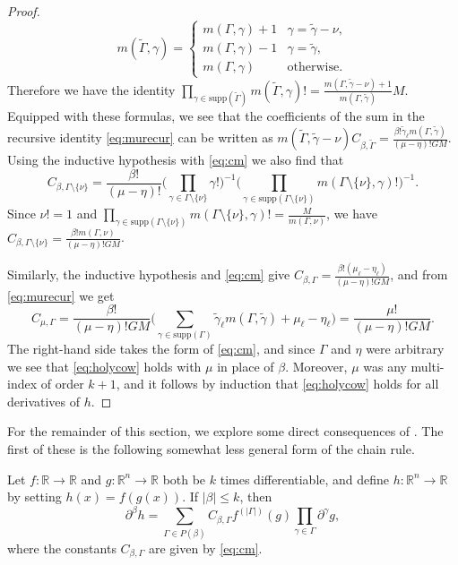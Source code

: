 \documentclass[oneside,hidelinks,indentfirst,10pt]{book}
\begin{document}
\begin{proof}
\[
    m(\tilde{\Gamma},\gamma)=\begin{cases}
    m(\Gamma,\gamma)+1 & \gamma=\tilde{\gamma}-\nu,\\
    m(\Gamma,\gamma)-1 & \gamma=\tilde{\gamma},\\
    m(\Gamma,\gamma) & \mathrm{otherwise}.
    \end{cases}
\]
Therefore we have the identity \(\prod_{\gamma\in\mathrm{supp}(\tilde{\Gamma})}m(\tilde{\Gamma},\gamma)!=\frac{m(\Gamma,\tilde{\gamma}-\nu)+1}{m(\Gamma,\tilde{\gamma})}M\). Equipped with these formulas, we see that the coefficients of the sum in the recursive identity \eqref{eq:murecur} can be written as \(m(\tilde{\Gamma},\tilde{\gamma}-\nu)C_{\beta,\tilde{\Gamma}}=\frac{\beta!\tilde{\gamma}_\ell m(\Gamma,\tilde{\gamma})}{(\mu-\eta)!GM}\). Using the inductive hypothesis with \eqref{eq:cm} we also find that
\[
     C_{\beta,\Gamma\setminus\{\nu\}}=\frac{\beta!}{(\mu-\eta)!}\bigg(\prod_{\gamma\in\Gamma\setminus\{\nu\}}\gamma!\bigg)^{-1}\bigg(\prod_{\gamma\in\mathrm{supp}(\Gamma\setminus\{\nu\})}m(\Gamma\setminus\{\nu\},\gamma)!\bigg)^{-1}.
\]
Since \(\nu!=1\) and \(\prod_{\gamma\in\mathrm{supp}(\Gamma\setminus\{\nu\})}m(\Gamma\setminus\{\nu\},\gamma)!=\frac{M}{m(\Gamma,\nu)}\), we have \(C_{\beta,\Gamma\setminus\{\nu\}}=\frac{\beta!m(\Gamma,\nu)}{(\mu-\eta)!GM}\). 


Similarly, the inductive hypothesis and \eqref{eq:cm} give \(C_{\beta,\Gamma}=\frac{\beta!(\mu_\ell-\eta_\ell)}{(\mu-\eta)!GM}\), and from \eqref{eq:murecur} we get
\[
    C_{\mu,\Gamma}=\frac{\beta!}{(\mu-\eta)!GM}\bigg(\sum_{\gamma\in\mathrm{supp}(\Gamma)}\tilde{\gamma}_\ell m(\Gamma,\tilde{\gamma})+\mu_\ell-\eta_\ell\bigg)=\frac{\mu!}{(\mu-\eta)!GM}.
\]
The right-hand side takes the form of \eqref{eq:cm}, and since \(\Gamma\) and \(\eta\) were arbitrary we see that \eqref{eq:holycow} holds with \(\mu\) in place of \(\beta\). Moreover, \(\mu\) was any multi-index of order \(k+1\), and it follows by induction that \eqref{eq:holycow} holds for all derivatives of \(h\).
\end{proof}


For the remainder of this section, we explore some direct consequences of . The first of these is the following somewhat less general form of the chain rule.


\begin{cor}\label{cor:chain2}
Let \(f:\mathbb{R}\rightarrow\mathbb{R}\) and  \(g:\mathbb{R}^n\rightarrow\mathbb{R}\) both be \(k\) times differentiable, and define \(h:\mathbb{R}^n\rightarrow\mathbb{R}\) by setting \(h(x)=f(g(x))\). If \(|\beta|\leq k\), then 
\begin{equation}\label{eq:orderedcr}
    \partial^\beta h =\sum_{\Gamma\in P(\beta)}C_{\beta,\Gamma}f^{(|\Gamma|)}(g)\prod_{\gamma\in\Gamma}\partial^\gamma g,
\end{equation}
where the constants \(C_{\beta,\Gamma}\) are given by \eqref{eq:cm}.
\end{cor}
\end{document}
